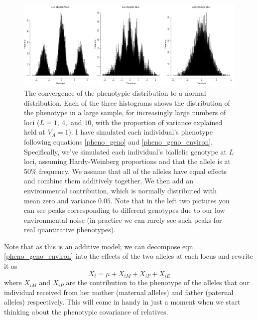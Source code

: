 \begin{figure}
\begin{center}
\includegraphics[width=\textwidth]{figures/QT1.png}
\end{center}
\caption{The convergence of the phenotypic distribution to a normal
  distribution. Each of the three histograms shows the distribution of
the phenotype in a large sample, for increasingly large numbers of loci ($L=1,~4,$ and $10$, with the proportion of variance explained held at $V_A=1$). I have simulated each individual's
phenotype following equations \ref{pheno_geno} and \ref{pheno_geno_environ}. Specifically, we've simulated each
individual's biallelic genotype at $L$ loci, assuming Hardy-Weinberg proportions
and that the allele is at 50\% frequency. We assume that all of the
alleles have equal effects and combine them additively together. We
then add an environmental contribution, which is normally distributed
with mean zero and variance $0.05$. Note that in the left two pictures you can see peaks
corresponding to different genotypes due to our low  environmental
noise (in practice we can rarely see such peaks for real quantitative phenotypes). } \label{fig:QT1}
\end{figure}
Note that as this is an additive model; we can decompose eqn. \ref{pheno_geno_environ} into the
effects of the two alleles at each locus and rewrite
it as
\begin{equation}
X_i = \mu + X_{iM}+X_{iP} +X_{iE} \label{eqn:mum_and_pop_var}
\end{equation}
where $X_{iM}$ and $X_{iP}$ are the contribution to the phenotype of
the alleles that our individual received from her mother (maternal
alleles) and father (paternal alleles) respectively. This will come in
handy in just a moment when we start thinking about the phenotypic covariance of relatives.\\

